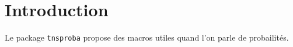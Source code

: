 \documentclass[12pt,a4paper]{article}
\begin{document}
\section{Introduction}

Le package \verb+tnsproba+ propose des macros utiles quand l'on parle de probailités.
\end{document}

